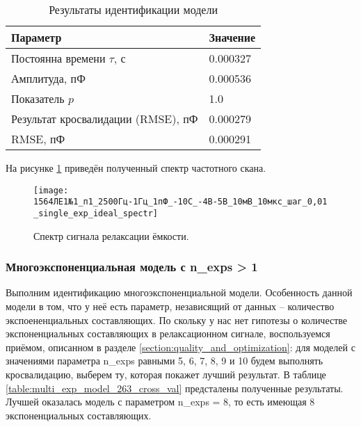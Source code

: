	\begin{table}[!htp]
    	\centering
    	\caption{Результаты идентификации модели}
		\begin{tabular}{|l|l|}
			\hline
			Параметр                           & Значение \\ \hline
			Постоянна времени $\tau$, с        & 0.000327 \\ \hline
			Амплитуда, пФ                      & 0.000536 \\ \hline
			Показатель $p$                     & 1.0      \\ \hline
			Результат кросвалидации (RMSE), пФ & 0.000279 \\ \hline
			RMSE, пФ                           & 0.000291 \\ \hline
		\end{tabular}
		\label{table:results_single_exp_ideal_263}
	\end{table}

	На рисунке \ref{pic:spectr_single_exp_ideal_263} приведён полученный спектр 
	частотного скана.

	\begin{figure}[!htp]
		\centering
		\texttt{[image: 1564ЛЕ1№1\_п1\_2500Гц-1Гц\_1пФ\_-10С\_-4В-5В\_10мВ\_10мкс\_шаг\_0,01\_single\_exp\_ideal\_spectr]}
		\caption{Спектр сигнала релаксации ёмкости.}
		\label{pic:spectr_single_exp_ideal_263}
	\end{figure}


	\newpage
	\subsubsection{Многоэкспоненциальная модель с n\_exps > 1}

	Выполним идентификацию многоэкспоненциальной модели. Особенность данной модели
	в том, что у неё есть параметр, независящий от данных -- количество
	экспоененциальных составляющих. По скольку у нас нет гипотезы о количестве
	экспоненциальных составляющих в релаксационном сигнале, воспользуемся приёмом,
	описанном в разделе \ref{section:quality_and_optimization}: для моделей
	с значениями параметра n\_exps равными 5, 6, 7, 8, 9 и 10 будем выполнять
	кросвалидацию, выберем ту, которая покажет лучший результат. В таблице
	\ref{table:multi_exp_model_263_cross_val} предсталены полученные результаты.
	Лучшей оказалась модель с параметром n\_exps = 8, то есть имеющая 8 
	экспоненциальных составляющих.

